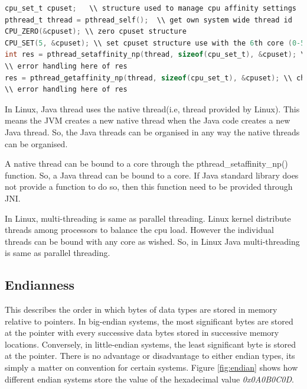 \documentclass[final_report.tex]{subfiles}
\begin{document}
\begin{lstlisting}[language=C, caption={Example of setting thread affinity}, label=lst:c_affinity]
cpu_set_t cpuset;	\\ structure used to manage cpu affinity settings
pthread_t thread = pthread_self();  \\ get own system wide thread id
CPU_ZERO(&cpuset); \\ zero cpuset structure
CPU_SET(5, &cpuset); \\ set cpuset structure use with the 6th core (0-5)
int res = pthread_setaffinity_np(thread, sizeof(cpu_set_t), &cpuset); \\ set affinity of thread
\\ error handling here of res
res = pthread_getaffinity_np(thread, sizeof(cpu_set_t), &cpuset); \\ check affinity of thread
\\ error handling here of res
\end{lstlisting}

In Linux, Java thread uses the native thread(i.e, thread provided by Linux).
This means the JVM creates a new native thread when the Java code creates a new Java thread. So, the Java threads can be organised in any way the native threads can be organised.

A native thread can be bound to a core through the pthread\_setaffinity\_np() function. So, a Java thread can be bound to a core. If Java standard library does not provide a function to do so, then this function need to be provided through JNI.

In Linux, multi-threading is same as parallel threading. Linux kernel distribute threads among processors to balance the cpu load. However the individual threads can be bound with any core as wished. So, in Linux Java multi-threading is same as parallel threading.

\subsection{Endianness}
This describes the order in which bytes of data types are stored in memory relative to pointers. In big-endian systems, the most significant bytes are stored at the pointer with every successive data bytes stored in successive memory locations. Conversely, in little-endian systems, the least significant byte is stored at the pointer. There is no advantage or disadvantage to either endian types, its simply a matter on convention for certain systems. Figure \ref{fig:endian} shows how different endian systems store the value of the hexadecimal value \textit{0x0A0B0C0D}. 
\end{document}
